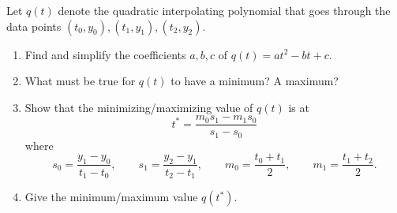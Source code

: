 \documentclass[10pt]{extarticle}
\begin{document}
\newpage

\begin{problem}[Problem 2]
Let $q(t)$ denote the quadratic interpolating polynomial that goes through the data points $(t_0,y_0),(t_1,y_1),(t_2,y_2)$.
\begin{enumerate}[label=(\alph*)]
\item Find and simplify the coefficients $a,b,c$ of $q(t)=at^2-bt+c$.
\item What must be true for $q(t)$ to have a minimum? A maximum?
\item Show that the minimizing/maximizing value of $q(t)$ is at
\[
t^*=\frac{m_0s_1-m_1s_0}{s_1-s_0}
\]
where
\[
s_0=\frac{y_1-y_0}{t_1-t_0},
\qquad
s_1=\frac{y_2-y_1}{t_2-t_1},
\qquad
m_0=\frac{t_0+t_1}{2},
\qquad
m_1=\frac{t_1+t_2}{2}.
\]
\item Give the minimum/maximum value $q(t^*)$.
\end{enumerate}
\end{problem}
\end{document}
